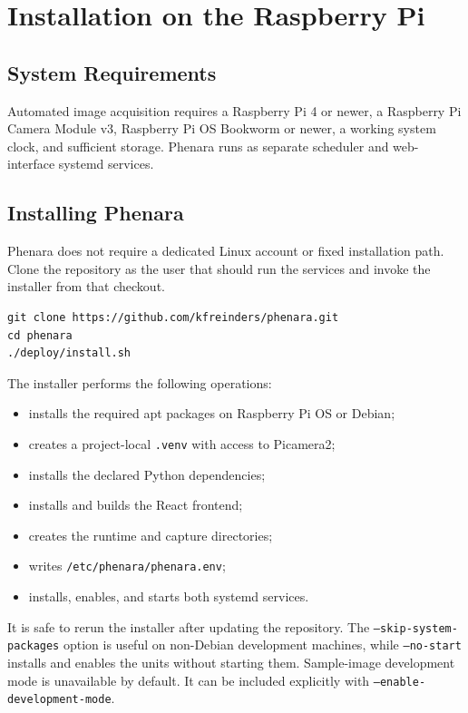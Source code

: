\section{Installation on the Raspberry Pi}

\subsection{System Requirements}

Automated image acquisition requires a Raspberry Pi 4 or newer, a Raspberry Pi
Camera Module v3, Raspberry Pi OS Bookworm or newer, a working system clock,
and sufficient storage. Phenara runs as separate scheduler and web-interface
systemd services.

\subsection{Installing Phenara}

Phenara does not require a dedicated Linux account or fixed installation path.
Clone the repository as the user that should run the services and invoke the
installer from that checkout.

\begin{verbatim}
git clone https://github.com/kfreinders/phenara.git
cd phenara
./deploy/install.sh
\end{verbatim}

The installer performs the following operations:

\begin{itemize}
  \item installs the required apt packages on Raspberry Pi OS or Debian;
  \item creates a project-local \texttt{.venv} with access to Picamera2;
  \item installs the declared Python dependencies;
  \item installs and builds the React frontend;
  \item creates the runtime and capture directories;
  \item writes \texttt{/etc/phenara/phenara.env};
  \item installs, enables, and starts both systemd services.
\end{itemize}

It is safe to rerun the installer after updating the repository. The
\texttt{--skip-system-packages} option is useful on non-Debian development
machines, while \texttt{--no-start} installs and enables the units without
starting them. Sample-image development mode is unavailable by default. It can
be included explicitly with \texttt{--enable-development-mode}.

